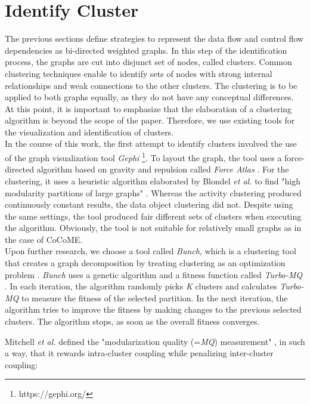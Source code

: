 \section{Identify Cluster}
\label{sec:Solution:IdentifyCluster}
The previous sections define strategies to represent the data flow and control flow dependencies as bi-directed weighted graphs. In this step of the identification process, the graphs are cut into disjunct set of nodes, called clusters. Common clustering techniques enable to identify sets of nodes with strong internal relationships and weak connections to the other clusters. The clustering is to be applied to both graphs equally, as they do not have any conceptual differences. At this point, it is important to emphasize that the elaboration of a clustering algorithm is beyond the scope of the paper. Therefore, we use existing tools for the visualization and identification of clusters. \\
In the course of this work, the first attempt to identify clusters involved the use of the graph visualization tool \textit{Gephi} \footnote{https://gephi.org/}. To layout the graph, the tool uses a force-directed algorithm based on gravity and repulsion called \textit{Force Atlas} \cite{gephi}. For the clustering, it uses a heuristic algorithm elaborated by Blondel \textit{et al.} to find "high modularity partitions of large graphs" \cite{modularity}. Whereas the activity clustering produced continuously constant results, the data object clustering did not. Despite using the same settings, the tool produced fair different sets of clusters when executing the algorithm. Obviously, the tool is not suitable for relatively small graphs as in the case of CoCoME.  \\
Upon further research, we choose a tool called \textit{Bunch}, which is a clustering tool that creates a graph decomposition by treating clustering as an optimization problem \cite{bunch}. \textit{Bunch} uses a genetic algorithm and a fitness function called \textit{Turbo-MQ} \cite{turbo-MQ}. In each iteration, the algorithm randomly picks \textit{K} clusters and calculates \textit{Turbo-MQ} to measure the fitness of the selected partition. In the next iteration, the algorithm tries to improve the fitness by making changes to the previous selected clusters. The algorithm stops, as soon as the overall fitness converges.\\

\pagebreak

\noindent
Mitchell \textit{et al.} defined the "modularization quality (=\textit{MQ}) measurement" \cite{turbo-MQ}, in such a way, that it rewards intra-cluster coupling while penalizing inter-cluster coupling:

